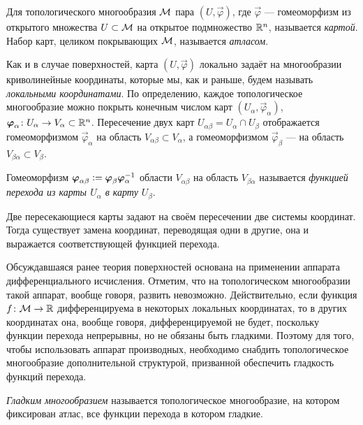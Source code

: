 \begin{definition}
	Для топологического многообразия $\M$ пара $(U, \vec{\varphi})$, где $\vec{\varphi}$ --- гомеоморфизм из открытого множества $U \subset \M$ на открытое подмножество $\R^n$, называется \textit{картой}. Набор карт, целиком покрывающих $\M$, называется \textit{атласом}.
\end{definition}

Как и в случае поверхностей, карта $(U, \vec{\varphi})$ локально задаёт на многообразии криволинейные координаты, которые мы, как и раньше, будем называть \textit{локальными координатами}. По определению, каждое топологическое многообразие можно покрыть конечным числом карт $(U_\alpha, \vec{\varphi}_\alpha)$, $\vec{\varphi}_\alpha\colon U_\alpha \to V_\alpha \subset \R^n$. Пересечение двух карт $U_{\alpha\beta} = U_\alpha \cap U_\beta$ отображается гомеоморфизмом $\vec{\varphi}_\alpha$ на область $V_{\alpha\beta} \subset V_\alpha$, а гомеоморфизмом $\vec{\varphi}_\beta$ --- на область $V_{\beta\alpha} \subset V_\beta$.

\begin{definition}
	Гомеоморфизм $\vec{\varphi}_{\alpha\beta} \vcentcolon = \vec{\varphi}_\beta\vec{\varphi}^{-1}_{\alpha}$ области $V_{\alpha\beta}$ на область $V_{\beta\alpha}$ называется \textit{функцией перехода из карты $U_\alpha$ в карту $U_\beta$}.
\end{definition}

Две пересекающиеся карты задают на своём пересечении две системы координат. Тогда существует замена координат, переводящая одни в другие, она и выражается соответствующей функцией перехода.

Обсуждавшаяся ранее теория поверхностей основана на применении аппарата дифференциального исчисления. Отметим, что на топологическом многообразии такой аппарат, вообще говоря, развить невозможно. Действительно, если функция $f\colon\M \to \R$ дифференцируема в некоторых локальных координатах, то в других координатах она, вообще говоря, дифференцируемой не будет, поскольку функции перехода непрерывны, но не обязаны быть гладкими. Поэтому для того, чтобы использовать аппарат производных, необходимо снабдить топологическое многообразие дополнительной структурой, призванной обеспечить гладкость функций перехода.

\begin{definition}
	\textit{Гладким многообразием} называется топологическое многообразие, на котором фиксирован атлас, все функции перехода в котором гладкие\footnotemark.
\end{definition}

